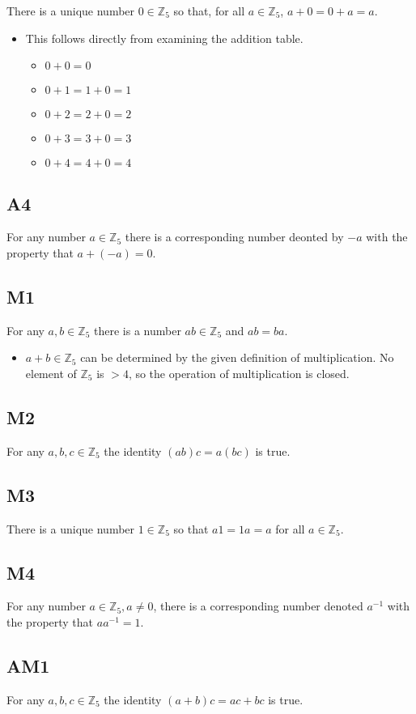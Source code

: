 \documentclass{article}
\begin{document}
There is a unique number $0\in\mathbb{Z}_5$ so that, for all $a\in\mathbb{Z}_5$, $a+0=0+a=a$.

\begin{itemize}
    \item This follows directly from examining the addition table.
    \begin{itemize}
        \item $0+0=0$
        \item $0+1=1+0=1$
        \item $0+2=2+0=2$
        \item $0+3=3+0=3$
        \item $0+4=4+0=4$
    \end{itemize}
\end{itemize}


\subsection{A4}

For any number $a\in\mathbb{Z}_5$ there is a corresponding number deonted by $-a$ with the property that $a+(-a)=0$.

\subsection{M1}

For any $a, b\in\mathbb{Z}_5$ there is a number $ab\in\mathbb{Z}_5$ and $ab=ba$.

\begin{itemize}
    \item $a+b\in\mathbb{Z}_5$ can be determined by the given definition of multiplication.  No element of $\mathbb{Z}_5$ is $>4$, so the operation of multiplication is closed.
\end{itemize}

\subsection{M2}

For any $a, b, c\in\mathbb{Z}_5$ the identity $(ab)c=a(bc)$ is true.

\subsection{M3}

There is a unique number $1\in\mathbb{Z}_5$ so that $a1=1a=a$ for all $a\in\mathbb{Z}_5$.

\subsection{M4}

For any number $a\in\mathbb{Z}_5, a\neq0$, there is a corresponding number denoted $a^{-1}$ with the property that $aa^{-1}=1$.

\subsection{AM1}

For any $a, b, c \in\mathbb{Z}_5$ the identity $(a+b)c=ac +bc$ is true.
\end{document}
